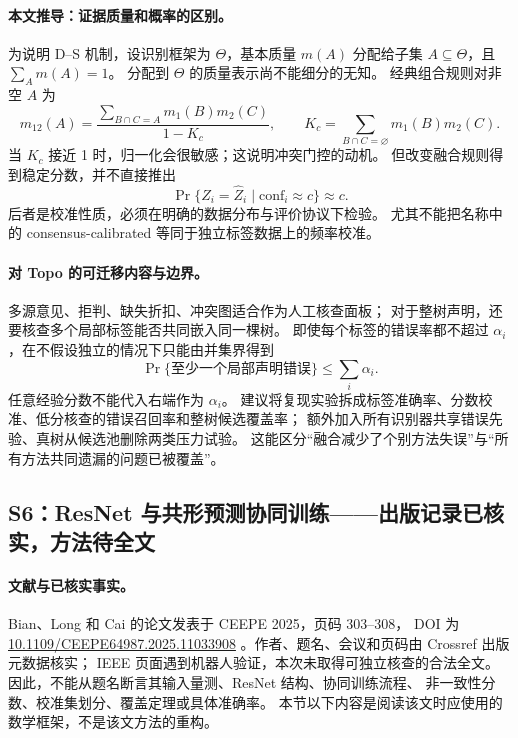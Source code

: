\documentclass[UTF8,11pt,fontset=fandol]{ctexart}
\theoremstyle{remark}
\numberwithin{equation}{section}
\begin{document}
\paragraph{本文推导：证据质量和概率的区别。}
为说明 D--S 机制，设识别框架为 $\Theta$，基本质量 $m(A)$ 分配给子集
$A\subseteq\Theta$，且 $\sum_A m(A)=1$。
分配到 $\Theta$ 的质量表示尚不能细分的无知。
经典组合规则对非空 $A$ 为
\begin{equation}
 m_{12}(A)=\frac{\sum_{B\cap C=A}m_1(B)m_2(C)}{1-K_c},
 \qquad K_c=\sum_{B\cap C=\varnothing}m_1(B)m_2(C).
 \label{eq:eng-ds}
\end{equation}
当 $K_c$ 接近 1 时，归一化会很敏感；这说明冲突门控的动机。
但改变融合规则得到稳定分数，并不直接推出
\begin{equation}
 \Pr\{Z_i=\widehat Z_i\mid \mathrm{conf}_i\approx c\}\approx c.
 \label{eq:eng-calibration}
\end{equation}
后者是校准性质，必须在明确的数据分布与评价协议下检验。
尤其不能把名称中的 consensus-calibrated 等同于独立标签数据上的频率校准。

\paragraph{对 Topo 的可迁移内容与边界。}
多源意见、拒判、缺失折扣、冲突图适合作为人工核查面板；
对于整树声明，还要核查多个局部标签能否共同嵌入同一棵树。
即使每个标签的错误率都不超过 $\alpha_i$，在不假设独立的情况下只能由并集界得到
\begin{equation}
 \Pr\{\text{至少一个局部声明错误}\}\leq\sum_i\alpha_i.
 \label{eq:eng-simultaneous}
\end{equation}
任意经验分数不能代入右端作为 $\alpha_i$。
建议将复现实验拆成标签准确率、分数校准、低分核查的错误召回率和整树候选覆盖率；
额外加入所有识别器共享错误先验、真树从候选池删除两类压力试验。
这能区分“融合减少了个别方法失误”与“所有方法共同遗漏的问题已被覆盖”。

\subsection{S6：ResNet 与共形预测协同训练——出版记录已核实，方法待全文}
\label{subsec:S6}

\paragraph{文献与已核实事实。}
Bian、Long 和 Cai 的论文发表于 CEEPE 2025，页码 303--308，
DOI 为 \href{https://doi.org/10.1109/CEEPE64987.2025.11033908}{10.1109/CEEPE64987.2025.11033908}
\citep{S6}。作者、题名、会议和页码由 Crossref 出版元数据核实；
IEEE 页面遇到机器人验证，本次未取得可独立核查的合法全文。
因此，不能从题名断言其输入量测、ResNet 结构、协同训练流程、
非一致性分数、校准集划分、覆盖定理或具体准确率。
本节以下内容是阅读该文时应使用的数学框架，不是该文方法的重构。
\end{document}
